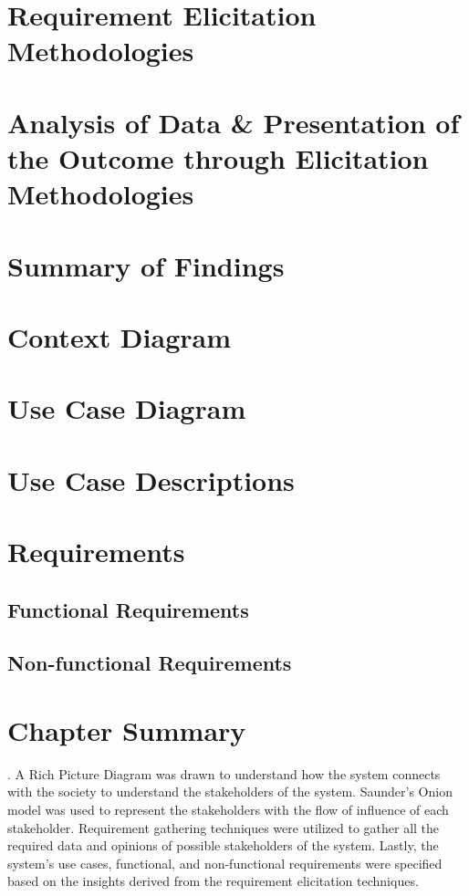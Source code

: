 \section{Requirement Elicitation Methodologies}

\section{Analysis of Data \& Presentation of the Outcome through Elicitation Methodologies}

\section{Summary of Findings}

\section{Context Diagram}

\section{Use Case Diagram}

\section{Use Case Descriptions}

\section{Requirements}

\subsection{Functional Requirements}

\subsection{Non-functional Requirements}

\section{Chapter Summary}
. A Rich Picture Diagram was drawn to understand how the system connects with the society to understand the stakeholders of the system. Saunder's Onion model was used to represent the stakeholders with the flow of influence of each stakeholder. Requirement gathering techniques were utilized to gather all the required data and opinions of possible stakeholders of the system. Lastly, the system's use cases, functional, and non-functional requirements were specified based on the insights derived from the requirement elicitation techniques.